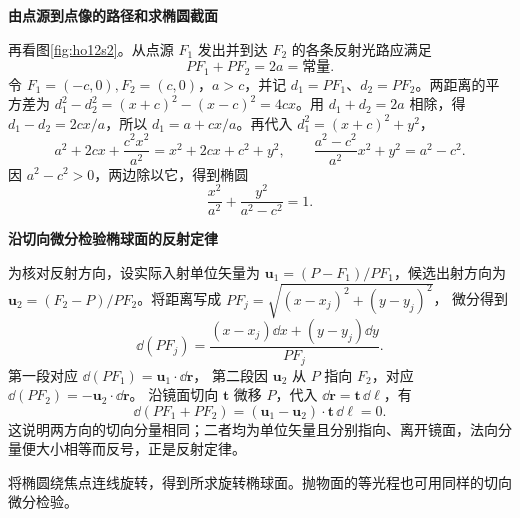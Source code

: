 \begin{solution}
\par\medskip{}\noindent\textbf{由点源到点像的路径和求椭圆截面}\par\nobreak
再看图\ref{fig:ho12s2}。从点源 $F_1$ 发出并到达 $F_2$ 的各条反射光路应满足
\[
PF_1+PF_2=2a=\text{常量}.
\]
令 $F_1=(-c,0),F_2=(c,0)$，$a>c$，并记 $d_1=PF_1$、$d_2=PF_2$。两距离的平方差为 $d_1^2-d_2^2=(x+c)^2-(x-c)^2=4cx$。用 $d_1+d_2=2a$ 相除，得 $d_1-d_2=2cx/a$，所以 $d_1=a+cx/a$。再代入 $d_1^2=(x+c)^2+y^2$，
\[
 a^2+2cx+\frac{c^2x^2}{a^2}=x^2+2cx+c^2+y^2,
 \qquad \frac{a^2-c^2}{a^2}x^2+y^2=a^2-c^2.
\]
因 $a^2-c^2>0$，两边除以它，得到椭圆
\[
\boxed{\frac{x^2}{a^2}+\frac{y^2}{a^2-c^2}=1.}
\]


\par\medskip{}\noindent\textbf{沿切向微分检验椭球面的反射定律}\par\nobreak
为核对反射方向，设实际入射单位矢量为 $\bm u_1=(P-F_1)/PF_1$，候选出射方向为 $\bm u_2=(F_2-P)/PF_2$。将距离写成 $PF_j=\sqrt{(x-x_j)^2+(y-y_j)^2}$，
微分得到
\[
 \dd(PF_j)=\frac{(x-x_j)\dd x+(y-y_j)\dd y}{PF_j}.
\]
第一段对应 $\dd(PF_1)=\bm u_1\cdot\dd\bm r$，
第二段因 $\bm u_2$ 从 $P$ 指向 $F_2$，对应
$\dd(PF_2)=-\bm u_2\cdot\dd\bm r$。
沿镜面切向 $\bm t$ 微移 $P$，代入 $\dd\bm r=\bm t\,\dd\ell$，有
\[
\dd(PF_1+PF_2)=(\bm u_1-\bm u_2)\cdot\bm t\,\dd\ell=0.
\]
这说明两方向的切向分量相同；二者均为单位矢量且分别指向、离开镜面，法向分量便大小相等而反号，正是反射定律。

将椭圆绕焦点连线旋转，得到所求旋转椭球面。抛物面的等光程也可用同样的切向微分检验。
\end{solution}


